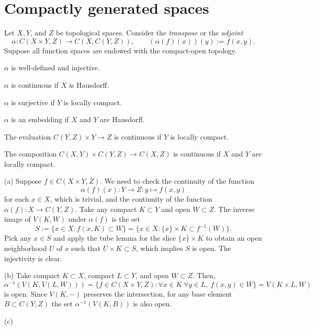\documentclass{../../large}
\begin{document}
\section{Compactly generated spaces}


\begin{prb}
Let $X,Y$, and $Z$ be topological spaces.
Consider the \emph{transpose} or the \emph{adjoint}
\[\alpha:C(X\times Y,Z)\to C(X,C(Y,Z)),\qquad(\alpha(f)(x))(y):=f(x,y).\]
Suppose all function spaces are endowed with the compact-open topology.
\begin{parts}
\item $\alpha$ is well-defined and injective.
\item $\alpha$ is continuous if $X$ is Hausdorff.
\item $\alpha$ is surjective if $Y$ is locally compact.
\item $\alpha$ is an embedding if $X$ and $Y$ are Hausdorff.
\item The evaluation $C(Y,Z)\times Y\to Z$ is continuous if $Y$ is locally compact.
\item The composition $C(X,Y)\times C(Y,Z)\to C(X,Z)$ is continuous if $X$ and $Y$ are locally compact.
\end{parts}
\end{prb}
\begin{pf}
(a)
Suppose $f\in C(X\times Y,Z)$.
We need to check the continuity of the function
\[\alpha(f)(x):Y\to Z:y\mapsto f(x,y)\]
for each $x\in X$, which is trivial, and the continuity of the function $\alpha(f):X\to C(Y,Z)$.
Take any compact $K\subset Y$ and open $W\subset Z$.
The inverse image of $V(K,W)$ under $\alpha(f)$ is the set
\[S:=\{x\in X:f(x,K)\subset W\}=\{x\in X:\{x\}\times K\subset f^{-1}(W)\}.\]
Pick any $x\in S$ and apply the tube lemma for the slice $\{x\}\times K$ to obtain an open neighborhood $U$ of $x$ such that $U\times K\subset S$, which implies $S$ is open.
The injectivity is clear.

(b)
Take compact $K\subset X$, compact $L\subset Y$, and open $W\subset Z$.
Then,
\[\alpha^{-1}(V(K,V(L,W)))=\{f\in C(X\times Y,Z):\forall x\in K\ \forall y\in L,\ f(x,y)\in W\}=V(K\times L,W)\]
is open.
Since $V(K,-)$ preserves the intersection, for any base element $B\subset C(Y,Z)$ the set $\alpha^{-1}(V(K,B))$ is also open.

(c)

\end{pf}
\end{document}

